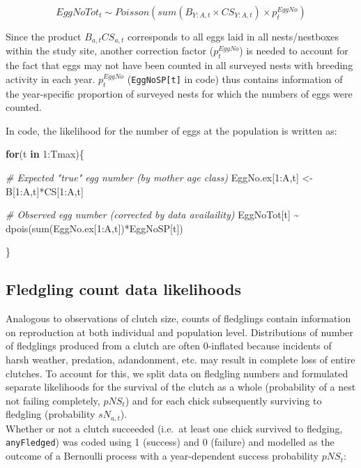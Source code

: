\documentclass[
]{book}
\newenvironment{Shaded}{\begin{snugshade}}{\end{snugshade}}
\newcommand{\CommentTok}[1]{\textcolor[rgb]{0.56,0.35,0.01}{\textit{#1}}}
\newcommand{\ControlFlowTok}[1]{\textcolor[rgb]{0.13,0.29,0.53}{\textbf{#1}}}
\newcommand{\DecValTok}[1]{\textcolor[rgb]{0.00,0.00,0.81}{#1}}
\newcommand{\FunctionTok}[1]{\textcolor[rgb]{0.00,0.00,0.00}{#1}}
\newcommand{\NormalTok}[1]{#1}
\newcommand{\OtherTok}[1]{\textcolor[rgb]{0.56,0.35,0.01}{#1}}
\newcommand{\SpecialCharTok}[1]{\textcolor[rgb]{0.00,0.00,0.00}{#1}}
\begin{document}
\begin{equation}
EggNoTot_t \sim Poisson(sum(B_{Y:A,t} \times CS_{Y:A,t}) \times p_t^{EggNo})
\end{equation}

Since the product \(B_{a,t}CS_{a,t}\) corresponds to all eggs laid in all
nests/nestboxes within the study site, another correction factor (\(p_t^{EggNo}\))
is needed to account for the fact that eggs may not have been counted in all
surveyed nests with breeding activity in each year. \(p_t^{EggNo}\)
(\texttt{EggNoSP{[}t{]}} in code) thus contains information of the year-specific proportion
of surveyed nests for which the numbers of eggs were counted.

In code, the likelihood for the number of eggs at the population is written as:

\begin{Shaded}
\begin{Highlighting}[]
\ControlFlowTok{for}\NormalTok{(t }\ControlFlowTok{in} \DecValTok{1}\SpecialCharTok{:}\NormalTok{Tmax)\{}

    \CommentTok{\# Expected "true" egg number (by mother age class)}
\NormalTok{    EggNo.ex[}\DecValTok{1}\SpecialCharTok{:}\NormalTok{A,t] }\OtherTok{\textless{}{-}}\NormalTok{ B[}\DecValTok{1}\SpecialCharTok{:}\NormalTok{A,t]}\SpecialCharTok{*}\NormalTok{CS[}\DecValTok{1}\SpecialCharTok{:}\NormalTok{A,t]}

    \CommentTok{\# Observed egg number (corrected by data availaility)}
\NormalTok{    EggNoTot[t] }\SpecialCharTok{\textasciitilde{}} \FunctionTok{dpois}\NormalTok{(}\FunctionTok{sum}\NormalTok{(EggNo.ex[}\DecValTok{1}\SpecialCharTok{:}\NormalTok{A,t])}\SpecialCharTok{*}\NormalTok{EggNoSP[t])}

\NormalTok{\}}
\end{Highlighting}
\end{Shaded}

\hypertarget{fledgling-count-data-likelihoods}{%
\subsection{Fledgling count data likelihoods}\label{fledgling-count-data-likelihoods}}

Analogous to observations of clutch size, counts of fledglings contain
information on reproduction at both individual and population level.
Distributions of number of fledglings produced from a clutch are often 0-inflated
because incidents of harsh weather, predation, adandonment, etc. may result in
complete loss of entire clutches. To account for this, we split data on fledgling
numbers and formulated separate likelihoods for the survival of the clutch as
a whole (probability of a nest not failing completely, \(pNS_t\)) and for each
chick subsequently surviving to fledgling (probability \(sN_{a,t}\)).\\
Whether or not a clutch succeeded (i.e.~at least one chick survived to fledging,
\texttt{anyFledged}) was coded using 1 (success) and 0 (failure) and modelled as the
outcome of a Bernoulli process with a year-dependent success probability \(pNS_t\):
\end{document}
